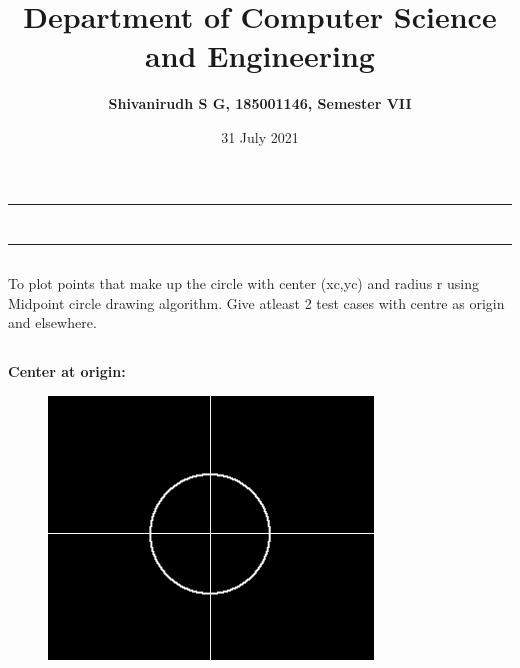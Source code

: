\documentclass[12pt,letterpaper]{article}
\title{\textbf{Department of Computer Science and Engineering}}
\author{\textbf{Shivanirudh S G, 185001146, Semester VII }}
\date{31 July 2021}
\begin{document}
\maketitle
\hrule
\section*{}
\hrule 
\bigskip\bigskip

\subsection*{}

\subsection*{}
\begin{flushleft}
     To plot points that make up the circle with center (xc,yc) and radius r using Midpoint circle drawing algorithm. Give atleast 2 test cases with centre as origin and elsewhere.   
\end{flushleft}

\subsection*{}
\begin{flushleft}




\end{flushleft}
\newpage
\subsection*{}
\textbf{Center at origin:}
\begin{figure}[h]
    \centering
    \includegraphics[height=7cm]{Midpoint/Outputs/Origin.png}
\end{figure}
\end{document}
